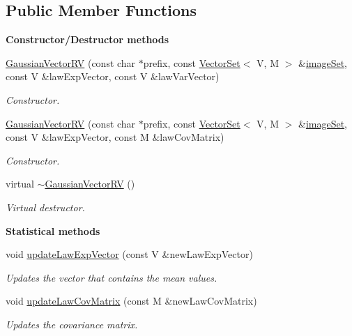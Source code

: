 \subsection*{Public Member Functions}
\begin{Indent}{\bf Constructor/\-Destructor methods}\par
\begin{DoxyCompactItemize}
\item 
\hyperlink{class_q_u_e_s_o_1_1_gaussian_vector_r_v_a20f697c49ff5cf6dc0e6813606c8b454}{Gaussian\-Vector\-R\-V} (const char $\ast$prefix, const \hyperlink{class_q_u_e_s_o_1_1_vector_set}{Vector\-Set}$<$ V, M $>$ \&\hyperlink{class_q_u_e_s_o_1_1_base_vector_r_v_aa4dd2f036228eac1f945bacc7147a922}{image\-Set}, const V \&law\-Exp\-Vector, const V \&law\-Var\-Vector)
\begin{DoxyCompactList}\small\item\em Constructor. \end{DoxyCompactList}\item 
\hyperlink{class_q_u_e_s_o_1_1_gaussian_vector_r_v_a5527b8a27d7eb6dc25e46b5d1bfedf3d}{Gaussian\-Vector\-R\-V} (const char $\ast$prefix, const \hyperlink{class_q_u_e_s_o_1_1_vector_set}{Vector\-Set}$<$ V, M $>$ \&\hyperlink{class_q_u_e_s_o_1_1_base_vector_r_v_aa4dd2f036228eac1f945bacc7147a922}{image\-Set}, const V \&law\-Exp\-Vector, const M \&law\-Cov\-Matrix)
\begin{DoxyCompactList}\small\item\em Constructor. \end{DoxyCompactList}\item 
virtual \hyperlink{class_q_u_e_s_o_1_1_gaussian_vector_r_v_a40cc393946f60513ce087f7fdd0dfb9f}{$\sim$\-Gaussian\-Vector\-R\-V} ()
\begin{DoxyCompactList}\small\item\em Virtual destructor. \end{DoxyCompactList}\end{DoxyCompactItemize}
\end{Indent}
\begin{Indent}{\bf Statistical methods}\par
\begin{DoxyCompactItemize}
\item 
void \hyperlink{class_q_u_e_s_o_1_1_gaussian_vector_r_v_aa8ff6b66ce8ad7b53d3f3f721229334d}{update\-Law\-Exp\-Vector} (const V \&new\-Law\-Exp\-Vector)
\begin{DoxyCompactList}\small\item\em Updates the vector that contains the mean values. \end{DoxyCompactList}\item 
void \hyperlink{class_q_u_e_s_o_1_1_gaussian_vector_r_v_a055c3ac22133d87cde4ea3e476b2d001}{update\-Law\-Cov\-Matrix} (const M \&new\-Law\-Cov\-Matrix)
\begin{DoxyCompactList}\small\item\em Updates the covariance matrix. \end{DoxyCompactList}\end{DoxyCompactItemize}
\end{Indent}
